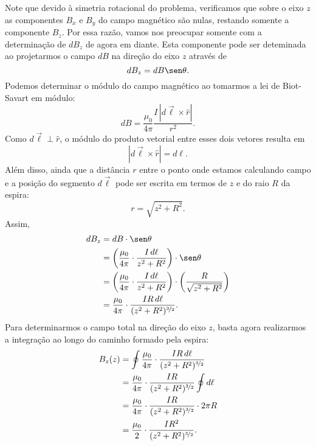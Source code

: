 Note que devido à simetria rotacional do problema, verificamos que sobre o eixo $z$ as componentes $B_x$ e $B_y$ do campo magnético são nulas, restando somente a componente $B_z$. Por essa razão, vamos nos preocupar somente com a determinação de $dB_z$ de agora em diante. Esta componente pode ser deteminada ao projetarmos o campo $dB$ na direção do eixo $z$ através de 
\begin{equation}
    dB_z = dB \sen\theta.
\end{equation}
%
Podemos determinar o módulo do campo magnético ao tomarmos a lei de Biot-Savart em módulo:
\begin{equation}
    dB = \frac{\mu_0}{4\pi} \frac{I\, |d\vec{\ell} \times \hat{r}|}{r^2}.
\end{equation}
%
Como $d\vec{\ell} \perp \hat{r}$, o módulo do produto vetorial entre esses dois vetores resulta em
\begin{equation}
    |d\vec{\ell} \times \hat{r}| = d\ell.
\end{equation}
%
Além disso, ainda que a distância $r$ entre o ponto onde estamos calculando campo e a posição do segmento $d\vec{\ell}$ pode ser escrita em termos de $z$ e do raio $R$ da espira:
\begin{equation}
    r = \sqrt{z^2 + R^2}.
\end{equation}
%
Assim,
\begin{align}
    dB_z &= dB \cdot \sen\theta \\
    &= \left(\frac{\mu_0}{4\pi} \cdot \frac{I \,d\ell}{z^2 + R^2}\right) \cdot \sen\theta \\
    &= \left(\frac{\mu_0}{4\pi} \cdot \frac{I \,d\ell}{z^2 + R^2}\right) \cdot \left(\frac{R}{\sqrt{z^2+R^2}}\right) \\
    &= \frac{\mu_0}{4\pi} \cdot \frac{IR \,d\ell}{(z^2 + R^2)^{\nicefrac{3}{2}}}.
\end{align}
%
Para determinarmos o campo total na direção do eixo $z$, basta agora realizarmos a integração ao longo do caminho formado pela espira:
\begin{align}
    B_z(z) &= \oint \frac{\mu_0}{4\pi} \cdot \frac{IR \,d\ell}{(z^2 + R^2)^{\nicefrac{3}{2}}} \\
    &= \frac{\mu_0}{4\pi} \cdot \frac{IR}{(z^2 + R^2)^{\nicefrac{3}{2}}} \oint d\ell \\
    &= \frac{\mu_0}{4\pi} \cdot \frac{IR}{(z^2 + R^2)^{\nicefrac{3}{2}}} \cdot 2\pi R \\
    &= \frac{\mu_0}{2} \cdot \frac{IR^2}{(z^2 + R^2)^{\nicefrac{3}{2}}}. \label{Eq:CampoMagneticoEspiraCircular}
\end{align}


